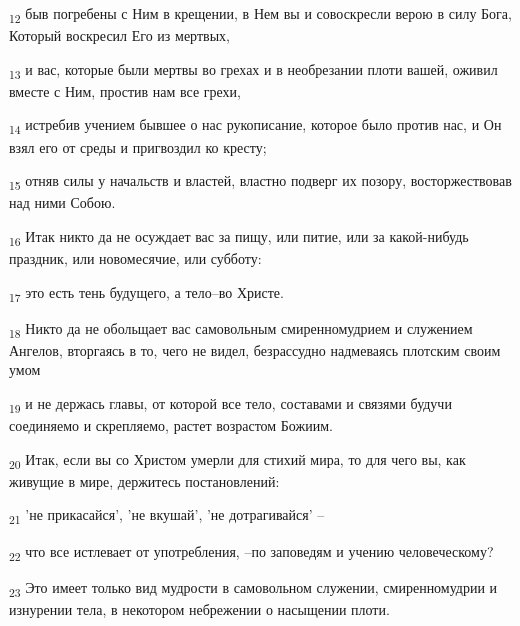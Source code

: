 \begin{tcolorbox}
\textsubscript{12} быв погребены с Ним в крещении, в Нем вы и совоскресли верою в силу Бога, Который воскресил Его из мертвых,
\end{tcolorbox}
\begin{tcolorbox}
\textsubscript{13} и вас, которые были мертвы во грехах и в необрезании плоти вашей, оживил вместе с Ним, простив нам все грехи,
\end{tcolorbox}
\begin{tcolorbox}
\textsubscript{14} истребив учением бывшее о нас рукописание, которое было против нас, и Он взял его от среды и пригвоздил ко кресту;
\end{tcolorbox}
\begin{tcolorbox}
\textsubscript{15} отняв силы у начальств и властей, властно подверг их позору, восторжествовав над ними Собою.
\end{tcolorbox}
\begin{tcolorbox}
\textsubscript{16} Итак никто да не осуждает вас за пищу, или питие, или за какой-нибудь праздник, или новомесячие, или субботу:
\end{tcolorbox}
\begin{tcolorbox}
\textsubscript{17} это есть тень будущего, а тело--во Христе.
\end{tcolorbox}
\begin{tcolorbox}
\textsubscript{18} Никто да не обольщает вас самовольным смиренномудрием и служением Ангелов, вторгаясь в то, чего не видел, безрассудно надмеваясь плотским своим умом
\end{tcolorbox}
\begin{tcolorbox}
\textsubscript{19} и не держась главы, от которой все тело, составами и связями будучи соединяемо и скрепляемо, растет возрастом Божиим.
\end{tcolorbox}
\begin{tcolorbox}
\textsubscript{20} Итак, если вы со Христом умерли для стихий мира, то для чего вы, как живущие в мире, держитесь постановлений:
\end{tcolorbox}
\begin{tcolorbox}
\textsubscript{21} 'не прикасайся', 'не вкушай', 'не дотрагивайся' --
\end{tcolorbox}
\begin{tcolorbox}
\textsubscript{22} что все истлевает от употребления, --по заповедям и учению человеческому?
\end{tcolorbox}
\begin{tcolorbox}
\textsubscript{23} Это имеет только вид мудрости в самовольном служении, смиренномудрии и изнурении тела, в некотором небрежении о насыщении плоти.
\end{tcolorbox}
